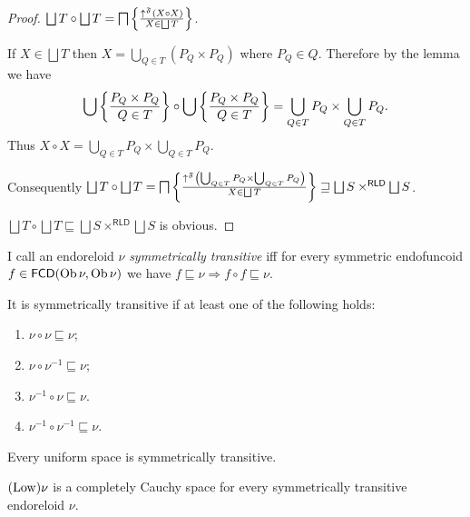 \begin{proof}
  $\bigsqcup T \circ \bigsqcup T = \bigsqcap \setcond{ \uparrow^{\mathfrak{F}}
  (X \circ X) }{ X \in \bigsqcup T }$.
  
  If $X \in \bigsqcup T$ then $X = \bigcup_{Q \in T} (P_Q \times P_Q)$ where
  $P_Q \in Q$. Therefore by the lemma we have
  \[ \bigcup \left\{ \frac{ P_Q \times P_Q}{Q \in T}\right\} \circ \bigcup
  \left\{ \frac{ P_Q \times P_Q}{ Q \in T }\right\} = \bigcup_{Q \in T} P_Q \times \bigcup_{Q \in T} P_Q .
  \]
  Thus $X \circ X = \bigcup_{Q \in T} P_Q \times \bigcup_{Q \in T} P_Q$.
  
  Consequently $\bigsqcup T \circ \bigsqcup T = \bigsqcap \setcond{
  \uparrow^{\mathfrak{F}} \left( \bigcup_{Q \in T} P_Q \times \bigcup_{Q \in
  T} P_Q \right)}{X \in \bigsqcup T }
  \sqsupseteq \bigsqcup S \times^{\mathsf{RLD}} \bigsqcup S$.
  
  $\bigsqcup T \circ \bigsqcup T \sqsubseteq \bigsqcup S
  \times^{\mathsf{RLD}} \bigsqcup S$ is obvious.
\end{proof}

\begin{defn}
  I call an endoreloid $\nu$ \emph{symmetrically transitive} iff for every
  symmetric endofuncoid $f \in \mathsf{FCD} (\operatorname{Ob} \nu , \operatorname{Ob}
  \nu)$ we have $f \sqsubseteq \nu \Rightarrow f \circ f \sqsubseteq \nu$.
\end{defn}

\begin{obvious}
  It is symmetrically transitive if at least one of the following holds:
  \begin{enumerate}
    \item $\nu \circ \nu \sqsubseteq \nu$;
    
    \item $\nu \circ \nu^{- 1} \sqsubseteq \nu$;
    
    \item $\nu^{- 1} \circ \nu \sqsubseteq \nu$.
    
    \item $\nu^{- 1} \circ \nu^{- 1} \sqsubseteq \nu$.
  \end{enumerate}
\end{obvious}

\begin{cor}
  Every uniform space is symmetrically transitive.
\end{cor}

\begin{prop}
  $(\operatorname{Low}) \nu$ is a completely Cauchy space for every symmetrically
  transitive endoreloid $\nu$.
\end{prop}


